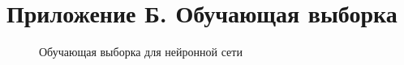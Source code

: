 \section*{Приложение Б. Обучающая выборка}

\begin{figure}[h]
\caption{Обучающая выборка для нейронной сети}
\label{ris:vibor}
\end{figure}
